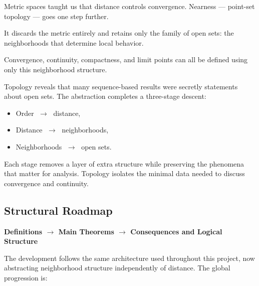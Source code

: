\begin{tcolorbox}[
  colback=gray!6,
  colframe=gray!40,
  arc=2pt,
  left=8pt, right=8pt, top=6pt, bottom=6pt,
  title={\small\textbf{Structural Role: Nearness --- Neighborhood Structure Without Distance}},
  fonttitle=\small\bfseries
]
Metric spaces taught us that distance controls convergence.
Nearness --- point-set topology --- goes one step further.

It discards the metric entirely
and retains only the family of open sets:
the neighborhoods that determine local behavior.

Convergence, continuity, compactness, and limit points
can all be defined using only this neighborhood structure.

Topology reveals that many sequence-based results
were secretly statements about open sets.
The abstraction completes a three-stage descent:

\begin{itemize}
  \item Order $\;\to\;$ distance,
  \item Distance $\;\to\;$ neighborhoods,
  \item Neighborhoods $\;\to\;$ open sets.
\end{itemize}

Each stage removes a layer of extra structure
while preserving the phenomena that matter for analysis.
Topology isolates the minimal data needed to discuss
convergence and continuity.
\end{tcolorbox}
\vspace{1em}

\subsection*{Structural Roadmap}

\begin{center}
\textbf{Definitions $\longrightarrow$ Main Theorems
$\longrightarrow$ Consequences and Logical Structure}
\end{center}

The development follows the same architecture used throughout this
project, now abstracting neighborhood structure independently of distance.
The global progression is:

